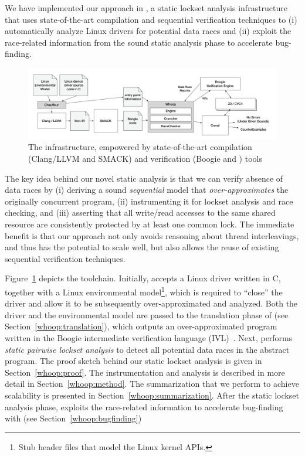 We have implemented our approach in \whoop, a static lockset analysis infrastructure that uses state-of-the-art compilation and sequential verification techniques to (i) automatically analyze Linux drivers for potential data races and (ii) exploit the race-related information from the sound static analysis phase to accelerate bug-finding.

\begin{figure}
\centering
\includegraphics[width=.99\linewidth]{img/whoop.pdf}
\caption{The \whoop infrastructure, empowered by state-of-the-art compilation (Clang/LLVM and SMACK) and verification (Boogie and \corral) tools}
\label{fig:whoop}
\end{figure}

The key idea behind our novel static analysis is that we can verify absence of data races by (i) deriving a sound \emph{sequential} model that \emph{over-approximates} the originally concurrent program, (ii) instrumenting it for lockset analysis and race checking, and (iii) asserting that all write/read accesses to the same shared resource are consistently protected by at least one common lock. The immediate benefit is that our approach not only avoids reasoning about thread interleavings, and thus has the potential to scale well, but also allows the reuse of existing sequential verification techniques.

Figure~\ref{fig:whoop} depicts the \whoop toolchain. Initially, \whoop accepts a Linux driver written in C, together with a Linux environmental model\footnote{Stub header files that model the Linux kernel APIs.}, which is required to ``close'' the driver and allow it to be subsequently over-approximated and analyzed. Both the driver and the environmental model are passed to the translation phase of \whoop (see Section~\ref{whoop:translation}), which outputs an over-approximated program written in the Boogie intermediate verification language (IVL)~\cite{deline2005boogiepl}. Next, \whoop performs \emph{static pairwise lockset analysis} to detect all potential data races in the abstract program. The proof sketch behind our static lockset analysis is given in Section~\ref{whoop:proof}. The instrumentation and analysis is described in more detail in Section~\ref{whoop:method}. The summarization that we perform to achieve scalability is presented in Section~\ref{whoop:summarization}. After the static lockset analysis phase, \whoop exploits the race-related information to accelerate bug-finding with \corral (see Section~\ref{whoop:bugfinding})


